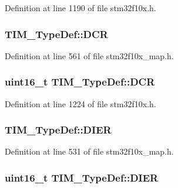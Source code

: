 Definition at line 1190 of file stm32f10x.\+h.

\subsubsection[{\texorpdfstring{D\+CR}{DCR}}]{ T\+I\+M\+\_\+\+Type\+Def\+::\+D\+CR}\hypertarget{struct_t_i_m___type_def_a401f7a8197e99b6284df1a9b91fc7653}{}\label{struct_t_i_m___type_def_a401f7a8197e99b6284df1a9b91fc7653}


Definition at line 561 of file stm32f10x\+\_\+map.\+h.

\subsubsection[{\texorpdfstring{D\+CR}{DCR}}]{ {\bf uint16\+\_\+t} T\+I\+M\+\_\+\+Type\+Def\+::\+D\+CR}\hypertarget{struct_t_i_m___type_def_ad3186a43824621f049e7eff37c88ad4e}{}\label{struct_t_i_m___type_def_ad3186a43824621f049e7eff37c88ad4e}


Definition at line 1224 of file stm32f10x.\+h.

\subsubsection[{\texorpdfstring{D\+I\+ER}{DIER}}]{ T\+I\+M\+\_\+\+Type\+Def\+::\+D\+I\+ER}\hypertarget{struct_t_i_m___type_def_ad76da44dc338134b244f4fffb71e1608}{}\label{struct_t_i_m___type_def_ad76da44dc338134b244f4fffb71e1608}


Definition at line 531 of file stm32f10x\+\_\+map.\+h.

\subsubsection[{\texorpdfstring{D\+I\+ER}{DIER}}]{ {\bf uint16\+\_\+t} T\+I\+M\+\_\+\+Type\+Def\+::\+D\+I\+ER}\hypertarget{struct_t_i_m___type_def_a25b145e57a694bb384eee08fcd107c3a}{}\label{struct_t_i_m___type_def_a25b145e57a694bb384eee08fcd107c3a}


